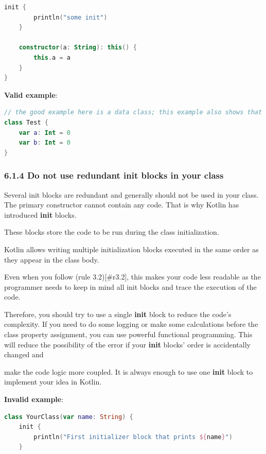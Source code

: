 {{{{{{{{{{{{{{{{{{{{\begin{lstlisting}[language=Kotlin]
    init {
        println("some init")
    }

    constructor(a: String): this() {
        this.a = a
    }
}
\end{lstlisting}


\textbf{Valid example}:

\begin{lstlisting}[language=Kotlin]
// the good example here is a data class; this example also shows that you should get rid of braces for the primary constructor
class Test {
    var a: Int = 0
    var b: Int = 0
}
\end{lstlisting}


\subsubsection*{\textbf{6.1.4 Do not use redundant init blocks in your class}}
\leavevmode\newline

\label{sec:6.1.4}

Several init blocks are redundant and generally should not be used in your class. The primary constructor cannot contain any code. That is why Kotlin has introduced \textbf{init} blocks.

These blocks store the code to be run during the class initialization.

Kotlin allows writing multiple initialization blocks executed in the same order as they appear in the class body.

Even when you follow (rule 3.2)[\#r3.2], this makes your code less readable as the programmer needs to keep in mind all init blocks and trace the execution of the code.

Therefore, you should try to use a single \textbf{init} block to reduce the code's complexity. If you need to do some logging or make some calculations before the class property assignment, you can use powerful functional programming. This will reduce the possibility of the error if your \textbf{init} blocks' order is accidentally changed and

make the code logic more coupled. It is always enough to use one \textbf{init} block to implement your idea in Kotlin.



\textbf{Invalid example}:

\begin{lstlisting}[language=Kotlin]
class YourClass(var name: String) {    
    init {
        println("First initializer block that prints ${name}")
    }
    

\end{lstlisting}}}}}}}}}}}}}}}}}}}}}
